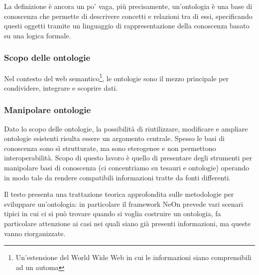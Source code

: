 La definizione è ancora un po' vaga, più precisamente, un'ontologia è una base di conoscenza che permette di descrivere concetti e relazioni tra di essi, specificando questi oggetti tramite un linguaggio di rappresentazione della conoscenza basato su una logica formale.
\subsubsection{Scopo delle ontologie}
Nel contesto del web semantico\footnote{Un'estensione del World Wide Web in cui le informazioni siano comprensibili ad un automa\cite{berners2001new}}, le ontologie sono il mezzo principale per condividere, integrare e scoprire dati\cite{hitzler2021review}.
\subsubsection{Manipolare ontologie}
 Dato lo scopo delle ontologie, la possibilità di riutilizzare, modificare e ampliare ontologie esistenti risulta essere un argomento centrale. Spesso le basi di conoscenza sono sì strutturate, ma sono eterogenee e non permettono interoperabilità. Scopo di questo lavoro è quello di presentare degli strumenti per manipolare basi di conoscenza (ci concentriamo su tesauri e ontologie) operando in modo tale da rendere compatibili informazioni tratte da fonti differenti. 
 
 Il testo \cite{suarez2015neon} presenta una trattazione teorica approfondita sulle metodologie per sviluppare un'ontologia: in particolare il framework NeOn prevede vari scenari tipici in cui ci si può trovare quando si voglia costruire un ontologia, fa particolare attenzione ai casi nei quali siano già presenti informazioni, ma queste vanno riorganizzate.
